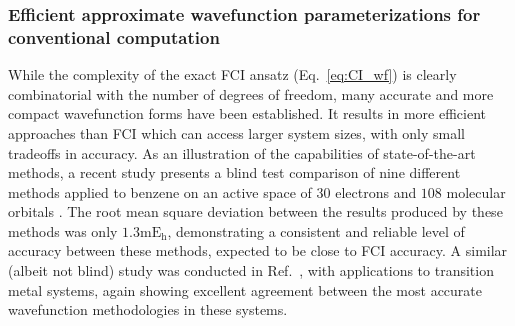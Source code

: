 \subsubsection{Efficient approximate wavefunction parameterizations for conventional computation}

While the complexity of the exact FCI ansatz (Eq.~\ref{eq:CI_wf}) is clearly combinatorial with the number of degrees of freedom, many accurate and more compact wavefunction forms have been established. It results in more efficient approaches than FCI which can access larger system sizes, with only small tradeoffs in accuracy. As an illustration of the capabilities of state-of-the-art methods, a recent study presents a blind test comparison of nine different methods applied to benzene on an active space of $30$ electrons and $108$ molecular orbitals \cite{Eriksen2020}. The root mean square deviation between the results produced by these methods was only $1.3 \text{mE}_{\text{h}}$, demonstrating a consistent and reliable level of accuracy between these methods, expected to be close to FCI accuracy. A similar (albeit not blind) study was conducted in Ref.~\cite{Williams2020}, with applications to transition metal systems, again showing excellent agreement between the most accurate wavefunction methodologies in these systems.

